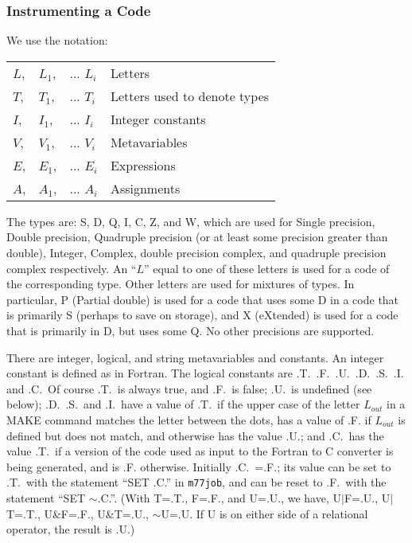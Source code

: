 \documentclass[twoside]{MATH77}
\begin{document}
\subsubsection{Instrumenting a Code}

We use the notation:

\begin{tabular}{l@{ }l@{ }ll}
$L$,&$L_1$,&... $L_i$ & Letters\newline\\
$T$,&$T_1$,&... $T_i$ & Letters used to denote types\newline\\
$I$,&$I_1$,&... $I_i$ & Integer constants\newline\\
$V$,&$V_1$,&... $V_i$ & Metavariables\newline\\
$E$,&$E_1$,&... $E_i$ & Expressions\newline\\
$A$,&$A_1$,&... $A_i$ & Assignments\newline\\
\end{tabular}

The types are: S, D, Q, I, C, Z, and W, which are used for Single
precision, Double precision, Quadruple precision (or at least some
precision greater than double), Integer, Complex, double precision
complex, and quadruple precision complex respectively.  An ``$L$''
equal to one of these letters is used for a code of the corresponding
type.  Other letters are used for mixtures of types.  In particular,
P (Partial double) is used for a code that uses some D in a code that
is primarily S (perhaps to save on storage), and X (eXtended) is used
for a code that is primarily in D, but uses some Q.  No other
precisions are supported.

There are integer, logical, and string metavariables and constants.
An integer constant is defined as in Fortran.  The logical constants
are .T.\, .F.\, .U.\, .D.\, .S.\, .I.\, and .C.\ Of course .T.\ is
always true, and .F.\ is false; .U.\ is undefined (see below); .D.\,
.S.\, and .I.\ have a value of .T.\ if the upper case of the letter
$L_{out}$ in a MAKE command matches the letter between the dots, has a
value of .F. if $L_{out}$ is defined but does not match, and otherwise
has the value .U.; and .C.\ has the value .T.\ if a version of the
code used as input to the Fortran to C converter is being generated,
and is .F.  otherwise.  Initially .C.\ =.F.; its value can be set to
.T.\ with the statement ``SET .C.'' in {\tt m77job}, and can be reset
to .F.\ with the statement ``SET $\sim $.C.''.  (With T=.T., F=.F.,
and U=.U., we have, U$|$F=.U., U$|$T=.T., U\&F=.F., U\&T=.U., $\sim
$U=.U.  If U is on either side of a relational operator, the result is
.U.)
\end{document}
